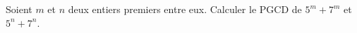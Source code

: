Soient $m$ et $n$ deux entiers premiers entre eux. Calculer le $\mathrm{PGCD}$ de $5^m + 7^m$ et $5^n + 7^n$.
